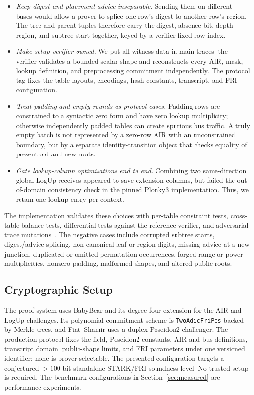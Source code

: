 \documentclass[twocolumn]{article}
\begin{document}
\begin{itemize}[nosep]
    \item \emph{Keep digest and placement advice inseparable.} Sending them on different buses would allow a prover to splice one row's digest to another row's region. The tree and parent tuples therefore carry the digest, absence bit, depth, region, and subtree start together, keyed by a verifier-fixed row index.
    \item \emph{Make setup verifier-owned.} We put all witness data in main traces; the verifier validates a bounded scalar shape and reconstructs every AIR, mask, lookup definition, and preprocessing commitment independently. The protocol tag fixes the table layouts, encodings, hash constants, transcript, and FRI configuration.
    \item \emph{Treat padding and empty rounds as protocol cases.} Padding rows are constrained to a syntactic zero form and have zero lookup multiplicity; otherwise independently padded tables can create spurious bus traffic. A truly empty batch is not represented by a zero-row AIR with an unconstrained boundary, but by a separate identity-transition object that checks equality of present old and new roots.
    \item \emph{Gate lookup-column optimizations end to end.} Combining two same-direction global LogUp receives appeared to save extension columns, but failed the out-of-domain consistency check in the pinned Plonky3 implementation. Thus, we retain one lookup entry per context.
\end{itemize}

The implementation validates these choices with per-table constraint tests, cross-table balance tests, differential tests against the reference verifier, and adversarial trace mutations~\cite{rsmtair}. The negative cases include corrupted subtree starts, digest/advice splicing, non-canonical leaf or region digits, missing advice at a new junction, duplicated or omitted permutation occurrences, forged range or power multiplicities, nonzero padding, malformed shapes, and altered public roots.

\subsection{Cryptographic Setup}

The proof system uses BabyBear and its degree-four extension for the AIR and LogUp challenges. Its polynomial commitment scheme is \texttt{TwoAdicFriPcs} backed by Merkle trees, and Fiat--Shamir uses a duplex Poseidon2 challenger. The production protocol fixes the field, Poseidon2 constants, AIR and bus definitions, transcript domain, public-shape limits, and FRI parameters under one versioned identifier; none is prover-selectable. The presented configuration targets a conjectured $> 100$-bit standalone STARK/FRI soundness level. No trusted setup is required. The benchmark configurations in Section~\ref{sec:measured} are performance experiments.
\end{document}

